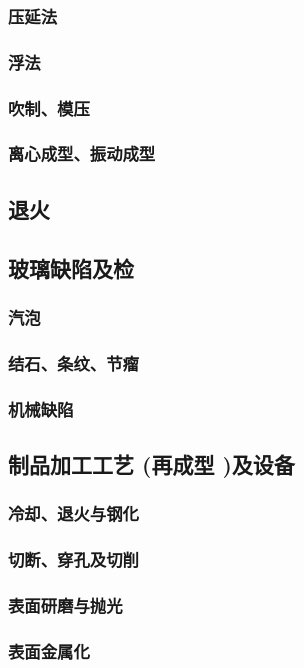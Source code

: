 \documentclass[UTF8]{../../ApplicationUniverse}
\begin{document}
        \subsubsection{压延法}
        \subsubsection{浮法}
        \subsubsection{吹制、模压}
        \subsubsection{离心成型、振动成型}
    \subsection{退火}
    \subsection{玻璃缺陷及检}
        \subsubsection{汽泡}
        \subsubsection{结石、条纹、节瘤}
        \subsubsection{机械缺陷}
    \subsection{制品加工工艺 (再成型 )及设备}
        \subsubsection{冷却、退火与钢化}
        \subsubsection{切断、穿孔及切削}
        \subsubsection{表面研磨与抛光}
        \subsubsection{表面金属化}
\end{document}
